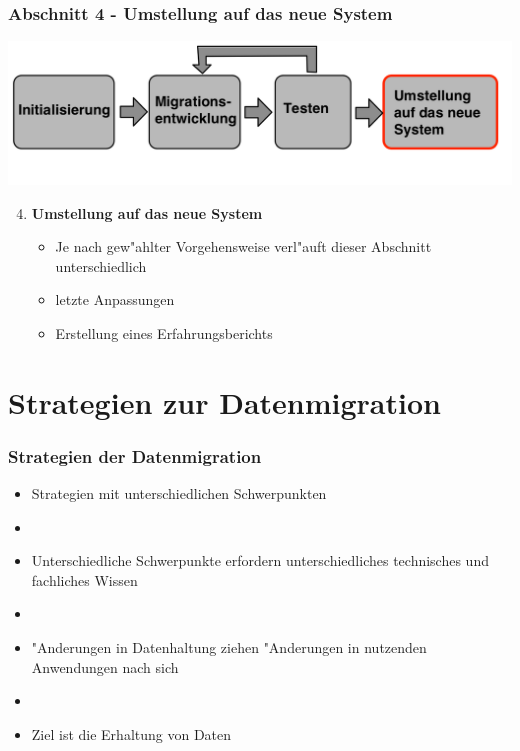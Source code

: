 \documentclass{beamer}
\begin{document}
	\begin{frame}
		\frametitle{Abschnitt 4 - Umstellung auf das neue System}
		
		\centering
		\includegraphics[width=\textwidth]{../images/prozessmodell4t.png}\\
		
		\begin{enumerate}
			\setcounter{enumi}{3}
						
			\item \textbf{Umstellung auf das neue System}
			\begin{itemize}
				\item Je nach gew"ahlter Vorgehensweise verl"auft dieser Abschnitt unterschiedlich
				\item letzte Anpassungen
				\newline
				\item Erstellung eines Erfahrungsberichts
			\end{itemize}
			
		\end{enumerate}
	\end{frame}
	\section{Strategien zur Datenmigration}
	
	\begin{frame}
		\frametitle{Strategien der Datenmigration}
		
		\begin{itemize}
			\item Strategien mit unterschiedlichen Schwerpunkten
			\item[]
			\item Unterschiedliche Schwerpunkte erfordern unterschiedliches technisches und fachliches Wissen
			\item[]
			\item "Anderungen in Datenhaltung ziehen "Anderungen in nutzenden Anwendungen nach sich
			\item[]
			\item Ziel ist die Erhaltung von Daten
		\end{itemize}
	\end{frame}
	
\end{document}
